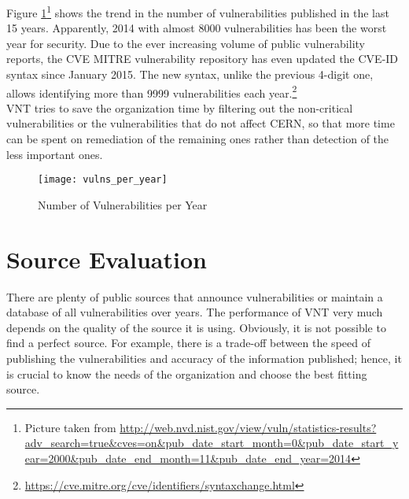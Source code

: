 Figure \ref{figure:vulns_per_year}\footnote{Picture taken from \url{http://web.nvd.nist.gov/view/vuln/statistics-results?adv_search=true&cves=on&pub_date_start_month=0&pub_date_start_year=2000&pub_date_end_month=11&pub_date_end_year=2014}} shows the trend in the number of vulnerabilities published in the last 15 years. Apparently, 2014 with almost 8000 vulnerabilities has been the worst year for security. Due to the ever increasing volume of public vulnerability reports, the CVE MITRE vulnerability repository has even updated the CVE-ID syntax since January 2015. The new syntax, unlike the previous 4-digit one, allows identifying more than 9999 vulnerabilities each year.\footnote{\url {https://cve.mitre.org/cve/identifiers/syntaxchange.html}} 
\\
VNT tries to save the organization time by filtering out the non-critical vulnerabilities or the vulnerabilities that do not affect CERN, so that more time can be spent on remediation of the remaining ones rather than detection of the less important ones.


\begin{figure}[h!]
\label{figure:vulns_per_year}
  \centering
    \texttt{[image: vulns\_per\_year]}
  \caption{Number of Vulnerabilities per Year}
  
\end{figure}

%

\section{Source Evaluation}
\label{source_evaluation}
There are plenty of public sources that announce vulnerabilities or maintain a database of all vulnerabilities over years. The performance of VNT very much depends on the quality of the source it is using. Obviously, it is not possible to find a perfect source. For example, there is a trade-off between the speed of publishing the vulnerabilities and accuracy of the information published; hence, it is crucial to know the needs of the organization and choose the best fitting source.

